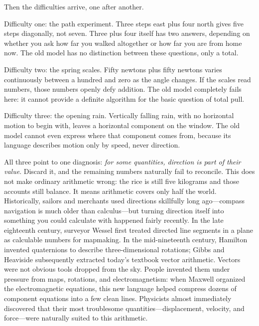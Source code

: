 Then the difficulties arrive, one after another.

Difficulty one: the path experiment. Three steps east plus four north gives five steps diagonally, not seven. Three plus four itself has two answers, depending on whether you ask how far you walked altogether or how far you are from home now. The old model has no distinction between these questions, only a total.

Difficulty two: the spring scales. Fifty newtons plus fifty newtons varies continuously between a hundred and zero as the angle changes. If the scales read numbers, those numbers openly defy addition. The old model completely fails here: it cannot provide a definite algorithm for the basic question of total pull.

Difficulty three: the opening rain. Vertically falling rain, with no horizontal motion to begin with, leaves a horizontal component on the window. The old model cannot even express where that component comes from, because its language describes motion only by speed, never direction.

All three point to one diagnosis: \emph{for some quantities, direction is part of their value}. Discard it, and the remaining numbers naturally fail to reconcile. This does not make ordinary arithmetic wrong: the rice is still five kilograms and those accounts still balance. It means arithmetic covers only half the world. Historically, sailors and merchants used directions skillfully long ago---compass navigation is much older than calculus---but turning direction itself into something you could calculate with happened fairly recently. In the late eighteenth century, surveyor Wessel first treated directed line segments in a plane as calculable numbers for mapmaking. In the mid-nineteenth century, Hamilton invented quaternions to describe three-dimensional rotations; Gibbs and Heaviside subsequently extracted today's textbook vector arithmetic. Vectors were not obvious tools dropped from the sky. People invented them under pressure from maps, rotations, and electromagnetism: when Maxwell organized the electromagnetic equations, this new language helped compress dozens of component equations into a few clean lines. Physicists almost immediately discovered that their most troublesome quantities---displacement, velocity, and force---were naturally suited to this arithmetic.


